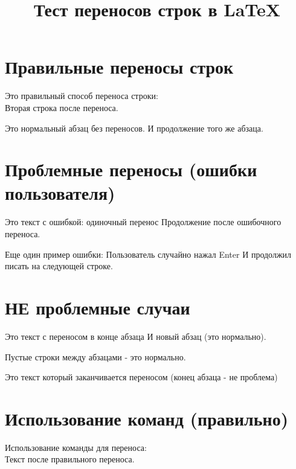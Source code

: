 \documentclass{article}
\begin{document}
\title{Тест переносов строк в LaTeX}
\maketitle

\section{Правильные переносы строк}

Это правильный способ переноса строки:\\
Вторая строка после переноса.

Это нормальный абзац без переносов.
И продолжение того же абзаца.

\section{Проблемные переносы (ошибки пользователя)}

Это текст с ошибкой: одиночный перенос
Продолжение после ошибочного переноса.

Еще один пример ошибки:
Пользователь случайно нажал Enter
И продолжил писать на следующей строке.

\section{НЕ проблемные случаи}

Это текст с переносом в конце абзаца
И новый абзац (это нормально).

Пустые строки между абзацами - это нормально.

Это текст который заканчивается переносом
(конец абзаца - не проблема)

\section{Использование команд (правильно)}

Использование команды для переноса:\\
Текст после правильного переноса.
\end{document}
